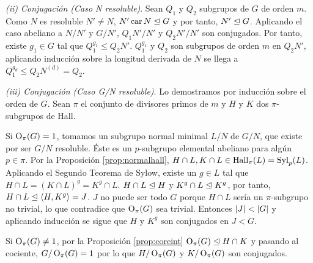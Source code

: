 \begin{teorema}
\begin{demostracion}
		\textit{(ii) Conjugación (Caso N resoluble)}. Sean $Q_1$ y $Q_2$ subgrupos de $G$ de orden $m$. Como $N$ es resoluble $N'\neq N$, $N'\operatorname{car} N\trianglelefteq G$ y por tanto, $N'\trianglelefteq G$. Aplicando el caso abeliano a $N/N'$ y $G/N'$, $Q_1N'/N'$ y $Q_2N'/N'$ son conjugados. Por tanto, existe $g_1\in G$ tal que $Q_1^{g_1} \leq Q_2 N'$. %
		$Q_1^{g_1}$ y $Q_2$ son subgrupos de orden $m$ en $Q_2N'$, aplicando inducción sobre la longitud derivada de $N$ se llega a $Q_1^{g_d}\leq Q_2N^{(d)} = Q_2$.
		
		\textit{(iii) Conjugación (Caso G/N resoluble)}. 
		Lo demostramos por inducción sobre el orden de $G$. Sean $\pi$ el conjunto de divisores primos de $m$ y $H$ y $K$ dos $\pi$-subgrupos de Hall. 
		
		Si $\operatorname{O}_\pi(G)=1$, tomamos un subgrupo normal minimal $L/N$ de $G/N$, que existe por ser $G/N$ resoluble. 
		Éste es un $p$-subgrupo elemental abeliano para algún $p\in\pi$. Por la Proposición \ref{prop:normalhall}, $H\cap L,K\cap L \in \operatorname{Hall}_\pi(L) = \operatorname{Syl}_p(L)$. Aplicando el Segundo Teorema de Sylow, existe un $g\in L$ tal que $H\cap L = (K\cap L)^g = K^g\cap L$. $H\cap L\trianglelefteq H$ y $K^g\cap L\trianglelefteq K^g$, por tanto, $H\cap L \trianglelefteq \left\langle H,K^g\right\rangle = J$. $J$ no puede ser todo $G$ porque $H\cap L$ sería un $\pi$-subgrupo no trivial, lo que contradice que $\operatorname{O}_\pi(G)$ sea trivial. Entonces $\left|J\right| < \left|G\right|$ y aplicando inducción se sigue que $H$ y $K^g$ son conjugados en $J < G$.
		
		Si $\operatorname{O}_\pi(G)\neq 1$, por la Proposición \ref{prop:coreint} $\operatorname{O}_\pi(G) \trianglelefteq H\cap K$ y pasando al cociente, $G/\operatorname{O}_\pi(G) = 1$ por lo que $H/\operatorname{O}_\pi(G)$ y $K/\operatorname{O}_\pi(G)$ son conjugados.
	\end{demostracion}
\end{teorema}

\begin{observacion}
\end{observacion}

